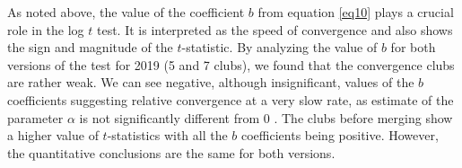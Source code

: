 \documentclass[11pt]{article}
\begin{document}
\begin{table}[!htbp] \centering 
 \caption{Convergence club classification after merging} 
  \label{Table_clubs1} 
\end{table}


As noted above, the value of the coefficient $b$ from equation \ref{eq10} plays a crucial role in the log $t$ test. It is interpreted as the speed of convergence and also shows the sign and magnitude of the $t$-statistic. By analyzing the value of $b$ for both versions of the test for 2019 (5 and 7 clubs), we found that the convergence clubs are rather weak. We can see negative, although insignificant, values of the $b$ coefficients suggesting relative convergence at a very slow rate, as estimate of the parameter $\alpha$ is not significantly different from 0 \citep{phillips2007transition}. The clubs before merging show a higher value of $t$-statistics with all the $b$ coefficients being positive. However, the quantitative conclusions are the same for both versions.
\end{document}
